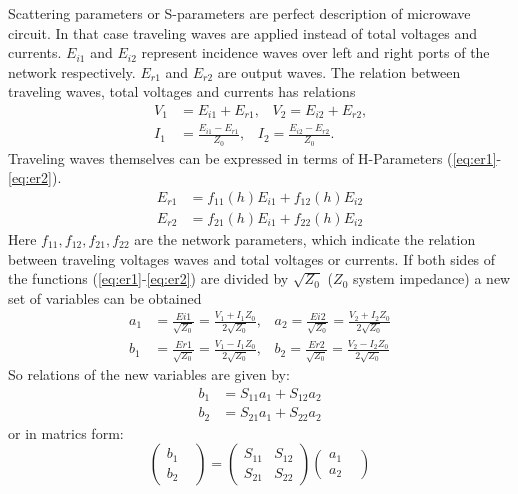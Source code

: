 Scattering parameters or S-parameters are perfect description of microwave circuit\cite{RF194_s_parameters}. In that case traveling waves are applied instead of total voltages and currents. $E_{i1}$ and $E_{i2}$ represent incidence waves over left and right ports of the network respectively. $E_{r1}$ and $E_{r2}$ are output waves. The relation between traveling waves, total voltages and currents has relations %
\begin{align}
V_{1}&=E_{i1}+E_{r1}\text{,}\quad V_{2}=E_{i2}+E_{r2}\text{,}
\label{eq:voltage_wave1}\\
I_{1}&=\frac{E_{i1}-E_{r1}}{Z_{0}}\text{,}\quad I_{2}=\frac{E_{i2}-E_{r2}}{Z_{0}}\text{.}
\label{eq:voltage_wave2}
\end{align}
Traveling waves themselves can be expressed in terms of H-Parameters (\ref{eq:er1}-\ref{eq:er2}). 
\begin{align}
E_{r1}&=f_{11}(h)E_{i1}+f_{12}(h)E_{i2}
\label{eq:er1}
\\
E_{r2}&=f_{21}(h)E_{i1}+f_{22}(h)E_{i2}
\label{eq:er2}
\end{align}
Here $f_{11}, f_{12}, f_{21}, f_{22}$ are the network parameters, which indicate the relation between traveling voltages waves and total voltages or currents. If both sides of the functions (\ref{eq:er1}-\ref{eq:er2}) are divided by $\sqrt{Z_{0}}$ ($Z_{0}$ system impedance) a new set of variables can be obtained
\begin{align} 
a_{1}&=\frac{Ei1}{\sqrt{Z_{0}}}=\frac{V_{1}+I_{1}Z_{0}}{2\sqrt{Z_{0}}} \text{,}\quad a_{2}=\frac{Ei2}{\sqrt{Z_{0}}}=\frac{V_{2}+I_{2}Z_{0}}{2\sqrt{Z_{0}}} \\
b_{1}&=\frac{Er1}{\sqrt{Z_{0}}}=\frac{V_{1}-I_{1}Z_{0}}{2\sqrt{Z_{0}}}  \text{,}\quad b_{2}=\frac{Er2}{\sqrt{Z_{0}}}=\frac{V_{2}-I_{2}Z_{0}}{2\sqrt{Z_{0}}}
\end{align}
So relations of the new variables are given by:
\begin{align}
b_{1}&=S_{11}a_{1}+S_{12}a_{2}\\
b_{2}&=S_{21}a_{1}+S_{22}a_{2}
\end{align}
or in matrics form:
\begin{equation}
		\begin{pmatrix}
			b_{1}&\\
			b_{2}&
		\end{pmatrix}
	=	
		\begin{pmatrix}
			S_{11}&S_{12}\\
			S_{21}&S_{22}
		\end{pmatrix}
		\begin{pmatrix}
			a_{1}&\\
			a_{2}&
		\end{pmatrix}
\label{eq:s_matrix}
\end{equation}

